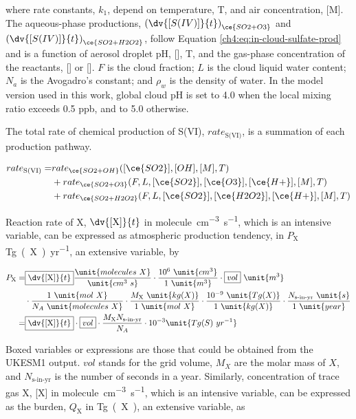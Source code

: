 where rate constants, $k_1$, depend on temperature, T, and air concentration, [M]. The aqueous-phase productions, $\left( \dv{[S(IV)]}{t}\right)_{\ce{SO2 + O3}}$ and $\left( \dv{[S(IV)]}{t}\right)_{\ce{SO2 + H2O2}}$,  follow Equation \ref{ch4:eq:in-cloud-sulfate-prod} and is a function of aerosol droplet pH, [], T, and the gas-phase concentration of the reactants, [] or []. $F$ is the cloud fraction; $L$ is the cloud liquid water content; $N_a$ is the Avogadro's constant; and $\rho_w$ is the density of water. In the model version used in this work, global cloud pH is set to 4.0 when the local  mixing ratio exceeds 0.5 ppb, and to 5.0 otherwise. 

The total rate of chemical production of S(VI), $rate_{\text{S(VI)}}$, is a summation of each production pathway. 

\begin{equation} \label{ch5:eq:rate_s(vi)}
\begin{aligned}
    rate_{\text{S(VI)}} = & rate_{\ce{SO2 + OH}}([\ce{SO2}],[OH],[M],T) \\
    &+ rate_{\ce{SO2 + O3}}(F,L,[\ce{SO2}],[\ce{O3}], [\ce{H+}],[M],T) \\
    &+ rate_{\ce{SO2 + H2O2}}(F,L,[\ce{SO2}],[\ce{H2O2}], [\ce{H+}],[M],T)
\end{aligned}
\end{equation}
    

Reaction rate of X, $\dv{[\text{X}]}{t}$ in \unit{molecule~cm^{-3}~s^{-1}}, which is an intensive variable, can be expressed as atmospheric production tendency, in $P_\text{X}$ \unit{Tg(X)~yr^{-1}}, an extensive variable, by

\begin{align*}
    P_\text{X} =& \boxed{\dv{[\text{X}]}{t}} \frac{\unit{molecules~X}}{\unit{cm^3~s}} 
    \cdot \frac{10^6~\unit{cm^3}}{1~\unit{m^3}}
    \cdot \boxed{vol}~\unit{m^3}\\
    & \cdot \frac{1~\unit{mol~X}}{N_A~\unit{molecules~X}}
    \cdot \frac{M_\text{X}~\unit{kg(X)}}{1~\unit{mol~X}}
    \cdot \frac{10^{-9}~\unit{Tg(X)}}{1~\unit{kg(X)}}
    \cdot \frac{N_{\text{s-in-yr}}~\unit{s}}{1~\unit{year}}\\
    =& \boxed{\dv{[\text{X}]}{t}} \cdot \boxed{vol}\cdot \frac{M_{\text{X}} N_{\text{s-in-yr}}}{N_A} \cdot 10^{-3} \unit{Tg(S)~yr^{-1}} \label{ch5:eq:p_rate_conv}
\end{align*}

Boxed variables or expressions are those that could be obtained from the UKESM1 output. $vol$ stands for the grid volume, $M_X$ are the molar mass of $X$, and $N_{\text{s-in-yr}}$ is the number of seconds in a year. Similarly, concentration of trace gas X, [X] in \unit{molecule~cm^{-3}~s^{-1}}, which is an intensive variable, can be expressed as the burden, $Q_\text{X}$ in \unit{Tg(X)}, an extensive variable, as

